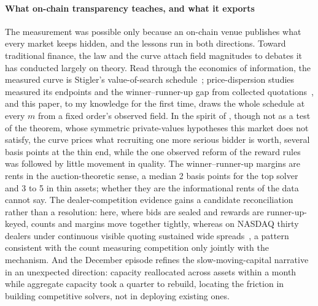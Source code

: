 \documentclass[11pt]{article}
\theoremstyle{plain}
\theoremstyle{definition}
\theoremstyle{remark}
\begin{document}
\paragraph{What on-chain transparency teaches, and what it exports} The measurement was possible only because an on-chain venue publishes what every market keeps hidden, and the lessons run in both directions. Toward traditional finance, the law and the curve attach field magnitudes to debates it has conducted largely on theory. Read through the economics of information, the measured curve is Stigler's value-of-search schedule~\citep{stigler1961information}; price-dispersion studies measured its endpoints and the winner--runner-up gap from collected quotations~\citep{pratt1979price,baye2004price}, and this paper, to my knowledge for the first time, draws the whole schedule at every $m$ from a fixed order's observed field. In the spirit of \citet{bulow1996auctions}, though not as a test of the theorem, whose symmetric private-values hypotheses this market does not satisfy, the curve prices what recruiting one more serious bidder is worth, several basis points at the thin end, while the one observed reform of the reward rules was followed by little movement in quality. The winner--runner-up margins are rents in the auction-theoretic sense, a median 2 basis points for the top solver and 3 to 5 in thin assets; whether they are the informational rents of \citet{biais2000competing} the data cannot say. The dealer-competition evidence gains a candidate reconciliation rather than a resolution: here, where bids are sealed and rewards are runner-up-keyed, counts and margins move together tightly, whereas on NASDAQ thirty dealers under continuous visible quoting sustained wide spreads~\citep{christie1994nasdaq}, a pattern consistent with the count measuring competition only jointly with the mechanism. And the December episode refines the slow-moving-capital narrative~\citep{duffie2010capital,grossman1988liquidity} in an unexpected direction: capacity reallocated across assets within a month while aggregate capacity took a quarter to rebuild, locating the friction in building competitive solvers, not in deploying existing ones.
\end{document}
